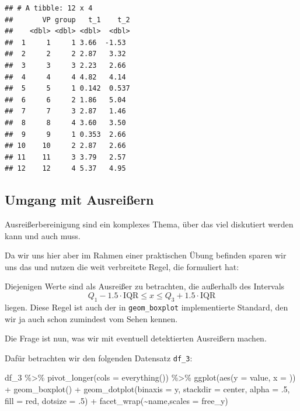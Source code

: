 \documentclass[
]{book}
\newenvironment{Shaded}{\begin{snugshade}}{\end{snugshade}}
\newcommand{\AttributeTok}[1]{\textcolor[rgb]{0.77,0.63,0.00}{#1}}
\newcommand{\DecValTok}[1]{\textcolor[rgb]{0.00,0.00,0.81}{#1}}
\newcommand{\FunctionTok}[1]{\textcolor[rgb]{0.00,0.00,0.00}{#1}}
\newcommand{\NormalTok}[1]{#1}
\newcommand{\SpecialCharTok}[1]{\textcolor[rgb]{0.00,0.00,0.00}{#1}}
\newcommand{\StringTok}[1]{\textcolor[rgb]{0.31,0.60,0.02}{#1}}
\begin{document}
\begin{verbatim}
## # A tibble: 12 x 4
##       VP group   t_1    t_2
##    <dbl> <dbl> <dbl>  <dbl>
##  1     1     1 3.66  -1.53 
##  2     2     2 2.87   3.32 
##  3     3     3 2.23   2.66 
##  4     4     4 4.82   4.14 
##  5     5     1 0.142  0.537
##  6     6     2 1.86   5.04 
##  7     7     3 2.87   1.46 
##  8     8     4 3.60   3.50 
##  9     9     1 0.353  2.66 
## 10    10     2 2.87   2.66 
## 11    11     3 3.79   2.57 
## 12    12     4 5.37   4.95
\end{verbatim}

\hypertarget{umgang-mit-ausreiuxdfern}{%
\subsection{Umgang mit Ausreißern}\label{umgang-mit-ausreiuxdfern}}

Ausreißerbereinigung sind ein komplexes Thema, über das viel diskutiert werden kann und auch muss.

Da wir uns hier aber im Rahmen einer praktischen Übung befinden sparen wir uns das und nutzen die weit verbreitete Regel, die \citet{tukeyExploratoryDataAnalysis1977} formuliert hat:

Diejenigen Werte sind als Ausreißer zu betrachten, die außerhalb des Intervals
\[Q_1 - 1.5 \cdot \text{IQR} \leq x \leq Q_3 + 1.5 \cdot \text{IQR}\]
liegen. Diese Regel ist auch der in \texttt{geom\_boxplot} implementierte Standard, den wir ja auch schon zumindest vom Sehen kennen.

Die Frage ist nun, was wir mit eventuell detektierten Ausreißern machen.

Dafür betrachten wir den folgenden Datensatz \texttt{df\_3}:

\begin{Shaded}
\begin{Highlighting}[]
\NormalTok{df\_3 }\SpecialCharTok{\%\textgreater{}\%} 
  \FunctionTok{pivot\_longer}\NormalTok{(}\AttributeTok{cols =} \FunctionTok{everything}\NormalTok{()) }\SpecialCharTok{\%\textgreater{}\%} 
  \FunctionTok{ggplot}\NormalTok{(}\FunctionTok{aes}\NormalTok{(}\AttributeTok{y =}\NormalTok{ value, }\AttributeTok{x =} \StringTok{\textquotesingle{}\textquotesingle{}}\NormalTok{)) }\SpecialCharTok{+}
  \FunctionTok{geom\_boxplot}\NormalTok{() }\SpecialCharTok{+}
  \FunctionTok{geom\_dotplot}\NormalTok{(}\AttributeTok{binaxis =} \StringTok{\textquotesingle{}y\textquotesingle{}}\NormalTok{,}
               \AttributeTok{stackdir =} \StringTok{\textquotesingle{}center\textquotesingle{}}\NormalTok{,}
               \AttributeTok{alpha =}\NormalTok{ .}\DecValTok{5}\NormalTok{,}
               \AttributeTok{fill =} \StringTok{\textquotesingle{}red\textquotesingle{}}\NormalTok{,}
               \AttributeTok{dotsize =}\NormalTok{ .}\DecValTok{5}\NormalTok{) }\SpecialCharTok{+}
  \FunctionTok{facet\_wrap}\NormalTok{(}\SpecialCharTok{\textasciitilde{}}\NormalTok{name,}\AttributeTok{scales =} \StringTok{\textquotesingle{}free\_y\textquotesingle{}}\NormalTok{)}
\end{Highlighting}
\end{Shaded}
\end{document}
